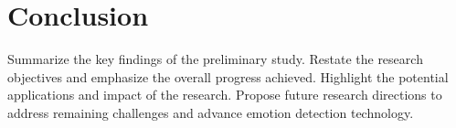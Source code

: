 \section{Conclusion}
\label{sec:conclusion}

Summarize the key findings of the preliminary study.
Restate the research objectives and emphasize the overall progress achieved.
Highlight the potential applications and impact of the research.
Propose future research directions to address remaining challenges and advance emotion detection technology.
